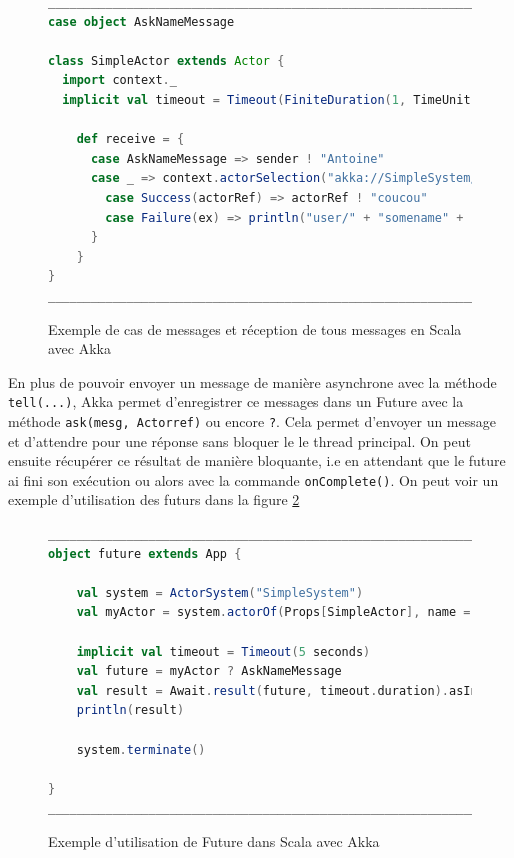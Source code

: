 \documentclass[12pt, a4paper]{article}
\begin{document}
\begin{figure}[h]
\centering
\begin{lstlisting}[language=scala]
__________________________________________________________________________
case object AskNameMessage

class SimpleActor extends Actor {
  import context._
  implicit val timeout = Timeout(FiniteDuration(1, TimeUnit.SECONDS))
  
	def receive = {
	  case AskNameMessage => sender ! "Antoine"
	  case _ => context.actorSelection("akka://SimpleSystem/user/SimpleActor2").resolveOne().onComplete {
	    case Success(actorRef) => actorRef ! "coucou"
	    case Failure(ex) => println("user/" + "somename" + " does not exist")
	  }
	}
}
__________________________________________________________________________
\end{lstlisting}
\caption{Exemple de cas de messages et réception de tous messages en Scala avec Akka}
\label{cas_mesg}
\end{figure}

\par En plus de pouvoir envoyer un message de manière asynchrone avec la méthode \texttt{tell(...)}, Akka permet d'enregistrer ce messages dans un Future avec la méthode \texttt{ask(mesg, Actorref)} ou encore \texttt{?}. Cela permet d'envoyer un message et d'attendre pour une réponse sans bloquer le le thread principal. On peut ensuite récupérer ce résultat de manière bloquante, i.e en attendant que le future ai fini son exécution ou alors avec la commande \texttt{onComplete()}. On peut voir un exemple d'utilisation des futurs dans  la figure \ref{futur}
\newline 

\begin{figure}[h]
\centering
\begin{lstlisting}[language=scala]
__________________________________________________________________________
object future extends App {

	val system = ActorSystem("SimpleSystem")
	val myActor = system.actorOf(Props[SimpleActor], name = "myActor")

	implicit val timeout = Timeout(5 seconds)
	val future = myActor ? AskNameMessage
	val result = Await.result(future, timeout.duration).asInstanceOf[String]
	println(result)

	system.terminate()

}
__________________________________________________________________________
\end{lstlisting}
\caption{Exemple d'utilisation de Future dans Scala avec Akka}
\label{futur}
\end{figure}
\end{document}
